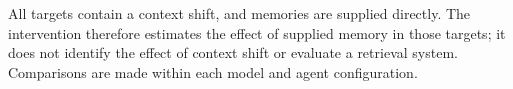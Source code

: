 All targets contain a context shift, and memories are supplied directly. The intervention therefore estimates the effect of supplied memory in those targets; it does not identify the effect of context shift or evaluate a retrieval system. Comparisons are made within each model and agent configuration.

